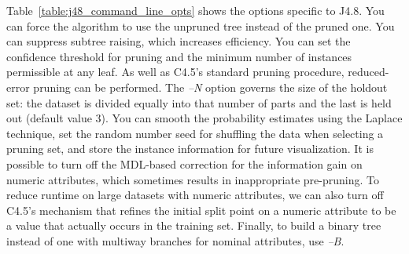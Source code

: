 Table~\ref{table:j48_command_line_opts} shows the options specific to
J4.8. You can force the algorithm to use the unpruned tree instead of
the pruned one. You can suppress subtree raising, which increases
efficiency. You can set the confidence threshold for pruning and the
minimum number of instances permissible at any leaf. As well as C4.5's
standard pruning procedure, reduced-error pruning can be
performed. The \textit{--N} option governs the size of the holdout
set: the dataset is divided equally into that number of parts and the
last is held out (default value 3). You can smooth the probability
estimates using the Laplace technique, set the random number seed for
shuffling the data when selecting a pruning set, and store the
instance information for future visualization. It is possible to turn
off the MDL-based correction for the information gain on numeric
attributes, which sometimes results in inappropriate pre-pruning. To
reduce runtime on large datasets with numeric attributes, we can also
turn off C4.5's mechanism that refines the initial split point on a
numeric attribute to be a value that actually occurs in the training
set. Finally, to build a binary tree instead of one with multiway
branches for nominal attributes, use \textit{--B}.
